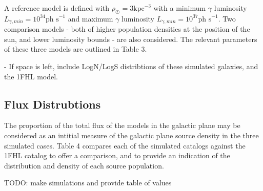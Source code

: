 \documentclass{PoS}
\begin{document}
A reference model is defined with $\rho_{\astrosun} = 3 \text{kpc}^{-3}$ with a minimum $\gamma$ luminosity $L_{\gamma, min} = 10^{34} \text{ph s}^{-1}$ and maximum $\gamma$ luminosity $L_{\gamma, min} = 10^{37} \text{ph s}^{-1}$. Two comparison models - both of higher population densities at the position of the sun, and lower luminosity bounds - are also considered. The relevant parameters of these three models are outlined in Table 3.

\begin{table}
\centering
{}
\caption{Parameters for 10 - 500 GeV Galaxy Population Simulations.}
\end{table}

- If space is left, include LogN/LogS distribtions of these simulated galaxies, and the 1FHL model.

\subsection{Flux Distrubtions}

The proportion of the total flux of the models in the galactic plane may be considered as an intitial measure of the galactic plane source density in the three simulated cases. Table 4 compares each of the simulated catalogs against the 1FHL catalog to offer a comparison, and to provide an indication of the distribution and density of each source population.

TODO: make simulations and provide table of values

\begin{table}
\centering
{}
\caption{Galactic plane fluxes for source population catalogs.}
\end{table}
\end{document}
